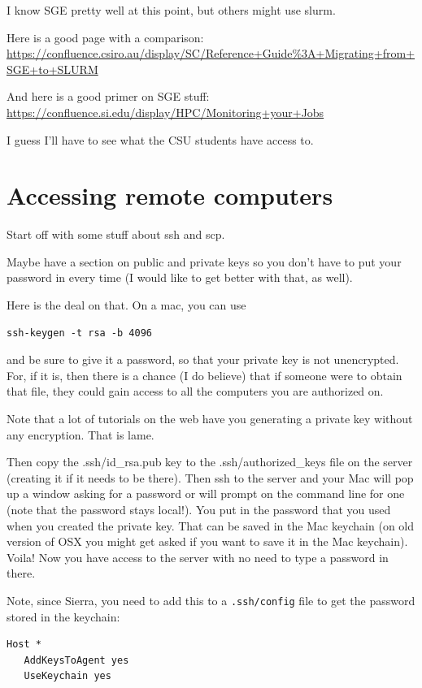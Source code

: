\documentclass[]{krantz}
\begin{document}
I know SGE pretty well at this point, but others might use slurm.

Here is a good page with a comparison: \url{https://confluence.csiro.au/display/SC/Reference+Guide\%3A+Migrating+from+SGE+to+SLURM}

And here is a good primer on SGE stuff: \url{https://confluence.si.edu/display/HPC/Monitoring+your+Jobs}

I guess I'll have to see what the CSU students have access to.

\hypertarget{accessing-remote-computers}{%
\section{Accessing remote computers}\label{accessing-remote-computers}}

Start off with some stuff about ssh and scp.

Maybe have a section on public and private keys so you don't have to put
your password in every time (I would like to get better with that,
as well).

Here is the deal on that. On a mac, you can use

\begin{verbatim}
ssh-keygen -t rsa -b 4096
\end{verbatim}

and be sure to give it a password, so that your private key is not unencrypted.
For, if it is, then there is a chance (I do believe) that if someone were to
obtain that file, they could gain access to all the computers you are authorized on.

Note that a lot of tutorials on the web have you generating a private key without
any encryption. That is lame.

Then copy the .ssh/id\_rsa.pub key to the .ssh/authorized\_keys file on the server
(creating it if it needs to be there). Then ssh to the server and your Mac will pop
up a window asking for a password or will prompt on the command line for one (note that the password stays local!). You put in
the password that you used when you created the private key. That
can be saved in the Mac keychain (on old version of OSX you might
get asked if you want to save it in the Mac keychain). Voila!
Now you have access to the server with no need to type a password in there.

Note, since Sierra, you need to add this to a \texttt{.ssh/config} file to get the password
stored in the keychain:

\begin{verbatim}
Host *
   AddKeysToAgent yes
   UseKeychain yes     
\end{verbatim}
\end{document}
